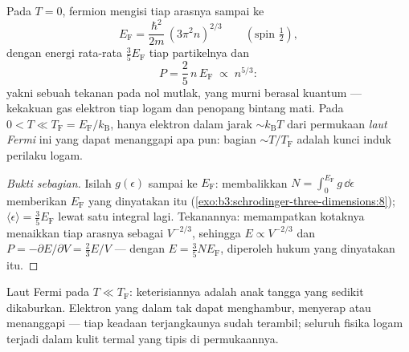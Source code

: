 \begin{theorem}\label{thm:b3:quantum-statistics:fermi}
Pada $T = 0$, fermion mengisi tiap arasnya sampai ke \emph{}
\[
E_{\text{F}} = \frac{\hbar^2}{2m}\,(3\pi^2n)^{2/3}
\qquad (\text{spin } \tfrac12) ,
\]
dengan energi rata-rata $\tfrac35 E_{\text{F}}$ tiap partikelnya dan
\emph{}
\[
P = \frac25\,n\,E_{\text{F}} \;\propto\; n^{5/3} :
\]
yakni sebuah tekanan pada nol mutlak, yang murni berasal kuantum ---
kekakuan gas elektron tiap logam dan penopang bintang mati. Pada
$0 < T \ll T_{\text{F}} = E_{\text{F}}/k_{\text{B}}$,
hanya elektron dalam jarak $\sim k_{\text{B}}T$ dari permukaan
\emph{laut Fermi} ini yang dapat menanggapi apa pun: bagian
$\sim T/T_{\text{F}}$ adalah kunci induk perilaku logam.
\end{theorem}

\begin{proof}[Bukti sebagian]
Isilah $g(\epsilon)$ sampai ke $E_{\text{F}}$: membalikkan $N = \int_0^{
E_{\text{F}}}g\,\dd\epsilon$ memberikan $E_{\text{F}}$ yang dinyatakan
itu (\cref{exo:b3:schrodinger-three-dimensions:8}); $\langle\epsilon
\rangle = \tfrac35 E_{\text{F}}$ lewat satu integral lagi. Tekanannya:
memampatkan kotaknya menaikkan tiap arasnya sebagai $V^{-2/3}$, sehingga $E
\propto V^{-2/3}$ dan $P = -\partial E/\partial V = \tfrac23 E/V$
--- dengan $E = \tfrac35 NE_{\text{F}}$, diperoleh hukum yang dinyatakan itu.
\end{proof}

\begin{omfigure}

{\small Laut Fermi pada $T \ll T_{\text{F}}$: keterisiannya adalah anak
tangga yang sedikit dikaburkan. Elektron yang dalam tak dapat
menghambur, menyerap atau menanggapi --- tiap keadaan terjangkaunya sudah
terambil; seluruh fisika logam terjadi dalam kulit termal yang tipis di
permukaannya.}
\end{omfigure}

